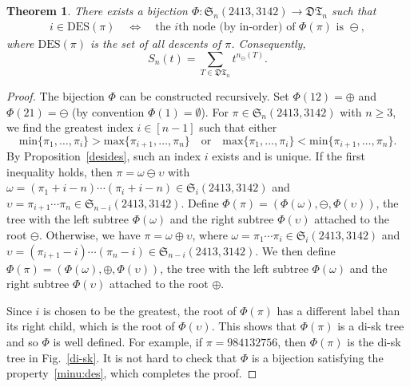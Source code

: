 \documentclass[12pt]{amsart}
\numberwithin{equation}{section}
\theoremstyle{plain}
\newtheorem{theorem}{Theorem}[section]
\theoremstyle{definition}
\def\DES{\mathrm{DES}}
\def\max{\mathrm{max}}
\def\min{\mathrm{min}}
\def\S{\mathfrak{S}}
\def\D{\mathfrak{D}}
\def\T{\mathfrak{T}}
\begin{document}
\begin{theorem}\label{disktr}
There exists a  bijection 
 $\Phi: \S_n(2413,3142)\rightarrow\D\T_n$ such that 
 \begin{align}\label{minu:des}
 i\in \DES(\pi) \quad\Leftrightarrow \quad \text{the $i$th node (by in-order) of $\Phi(\pi)$ is $\ominus$},
 \end{align}
 where $\DES(\pi)$ is the set of all descents of $\pi$. Consequently, 
 \begin{equation}\label{tree:version}
S_n(t)=\sum_{T\in \D\T_n} t^{n_\ominus(T)}.
\end{equation}
  \end{theorem}
  
 \begin{proof} The bijection $\Phi$ can be constructed recursively. Set $\Phi(12)=\oplus$ and $\Phi(21)=\ominus$ (by convention $\Phi(1)=\emptyset$). For $\pi\in\S_n(2413,3142)$ with $n\geq3$, we find the greatest index $i\in[n-1]$ such that either 
 $$\min\{\pi_1,\ldots,\pi_i\}>\max\{\pi_{i+1},\ldots,\pi_n\}\quad\text{or}\quad\max\{\pi_1,\ldots,\pi_i\}<\min\{\pi_{i+1},\ldots,\pi_n\}.$$
 By Proposition~\ref{desides}, such an index $i$ exists and is unique. If the first inequality holds, then $\pi=\omega\ominus\upsilon$ with $\omega=(\pi_1+i-n)\cdots(\pi_i+i-n)\in\S_i(2413,3142)$ and $\upsilon=\pi_{i+1}\cdots\pi_{n}\in\S_{n-i}(2413,3142)$. Define $\Phi(\pi)=(\Phi(\omega),\ominus,\Phi(\upsilon))$, the tree with the left subtree $\Phi(\omega)$ and the right subtree $\Phi(\upsilon)$ attached to the root $\ominus$. Otherwise, we have $\pi=\omega\oplus\upsilon$, where $\omega=\pi_1\cdots\pi_i\in\S_i(2413,3142)$ and $\upsilon=(\pi_{i+1}-i)\cdots(\pi_{n}-i)\in\S_{n-i}(2413,3142)$. We then define $\Phi(\pi)=(\Phi(\omega),\oplus,\Phi(\upsilon))$, the tree with the left subtree $\Phi(\omega)$ and the right subtree $\Phi(\upsilon)$ attached to the root $\oplus$.
 
 Since $i$ is chosen to be the greatest,  the root of $\Phi(\pi)$ has a different label than its right child, which is the root of $\Phi(\upsilon)$. This shows that $\Phi(\pi)$ is a di-sk tree and  so $\Phi$ is well defined. For example, if $\pi=984132756$, then $\Phi(\pi)$ is the di-sk tree in Fig.~\ref{di-sk}. 
 It is not hard to check that $\Phi$ is a bijection satisfying the property~\eqref{minu:des}, which completes the proof.
 \end{proof}
 
\end{document}
